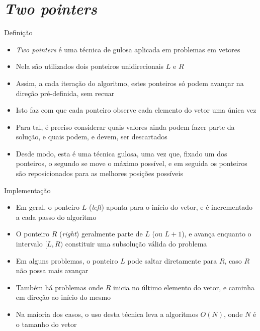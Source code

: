 \section{\it Two pointers}

\begin{frame}[fragile]{Definição}

    \begin{itemize}
        \item \textit{Two pointers} é uma técnica de gulosa aplicada em problemas em
            vetores

        \item Nela são utilizados dois ponteiros unidirecionais $L$ e $R$

        \item Assim, a cada iteração do algoritmo, estes ponteiros só podem avançar na direção
            pré-definida, sem recuar

        \item Isto faz com que cada ponteiro observe cada elemento do vetor uma única vez

        \item Para tal, é preciso considerar quais valores ainda podem fazer parte da solução,
            e quais podem, e devem, ser descartados

        \item Desde modo, esta é uma técnica gulosa, uma vez que, fixado um dos ponteiros, o
            segundo se move o máximo possível, e em seguida os ponteiros são reposicionados para
            as melhores posições possíveis

    \end{itemize}

\end{frame}

\begin{frame}[fragile]{Implementação}

    \begin{itemize}
        \item Em geral, o ponteiro $L$ (\textit{left}) aponta para o início do vetor, e é incrementado
            a cada passo do algoritmo

        \item O ponteiro $R$ (\textit{right}) geralmente parte de $L$ (ou $L + 1$), e avança enquanto
            o intervalo $[L, R)$ constituir uma subsolução válida do problema

        \item Em alguns problemas, o ponteiro $L$ pode saltar diretamente para $R$, caso $R$ não
            possa mais avançar

        \item Também há problemas onde $R$ inicia no último elemento do vetor, e caminha em direção
            ao início do mesmo

        \item Na maioria dos casos, o uso desta técnica leva a algoritmos $O(N)$, onde $N$ é o tamanho
            do vetor
    \end{itemize}

\end{frame}
